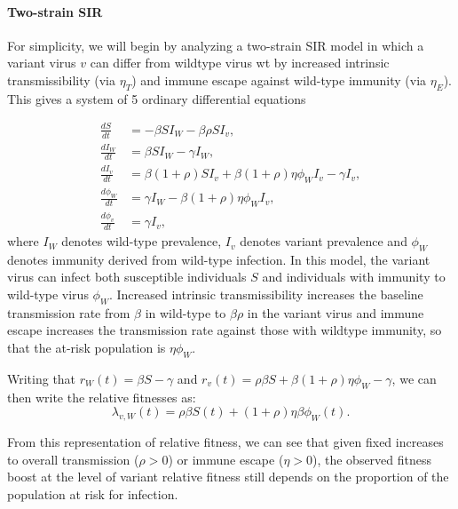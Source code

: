\documentclass[11pt,oneside,letterpaper]{article}
\newcommand{\wt}{W}
\newcommand{\varEscape}{\eta}
\newcommand{\varTransmission}{\rho}
\begin{document}
\paragraph{Two-strain SIR}%

For simplicity, we will begin by analyzing a two-strain SIR model in which a variant virus $v$ can differ from wildtype virus wt by increased intrinsic transmissibility (via $\varEscape_{T}$) and immune escape against wild-type immunity (via $\varEscape_{E}$).
This gives a system of 5 ordinary differential equations

\begin{align}
    \frac{d S}{d t} &= - \beta S I_{\wt} - \beta \varTransmission S I_{v},\\
    \frac{d I_{\wt}}{dt} &= \beta S I_{\wt} - \gamma I_{\wt},\\
    \frac{d I_{v}}{dt} &= \beta (1+\varTransmission) S I_{v} + \beta (1+\varTransmission) \varEscape \phi_{\wt} I_{v} - \gamma I_{v},\\
    \frac{d \phi_{\wt}}{dt} &= \gamma I_{\wt} - \beta (1+\varTransmission) \varEscape \phi_{\wt} I_{v},\\
    \frac{d \phi_{v}}{dt} &= \gamma I_{v},
\end{align}
where $I_{\wt}$ denotes wild-type prevalence, $I_{v}$ denotes variant prevalence and $\phi_{\wt}$ denotes immunity derived from wild-type infection.
In this model, the variant virus can infect both susceptible individuals $S$ and individuals with immunity to wild-type virus $\phi_{\wt}$.
Increased intrinsic transmissibility increases the baseline transmission rate from $\beta$ in wild-type to $\beta \varTransmission$ in the variant virus and immune escape increases the transmission rate against those with wildtype immunity, so that the at-risk population is $\varEscape \phi_{\wt}$.

Writing that $r_{\wt}(t) = \beta S - \gamma$ and $r_{v}(t) = \varTransmission \beta  S + \beta (1+\varTransmission) \varEscape \phi_{\wt} - \gamma$, we can then write the relative fitnesses as:
\begin{equation} \label{eq:two_strain_relative_fitness}
\lambda_{v,\wt}(t) = \varTransmission\beta S(t) + (1+\varTransmission) \varEscape \beta \phi_{\wt}(t).
\end{equation}

From this representation of relative fitness, we can see that given fixed increases to overall transmission ($\varTransmission > 0$) or immune escape ($\varEscape > 0$), the observed fitness boost at the level of variant relative fitness still depends on the proportion of the population at risk for infection.
\end{document}
